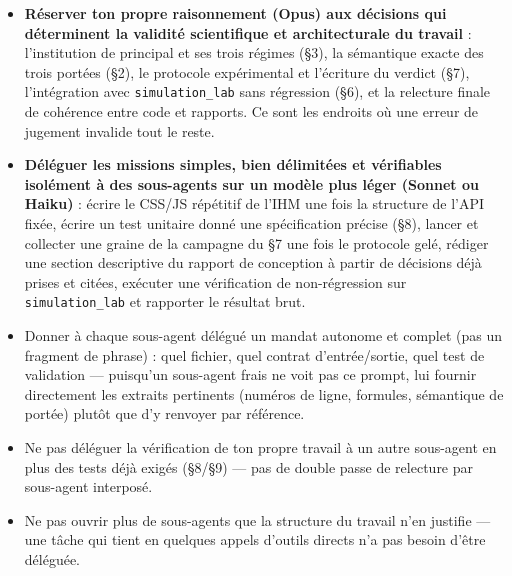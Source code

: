 \documentclass[11pt,a4paper]{article}
\newcommand{\code}[1]{\texttt{#1}}
\begin{document}
\begin{itemize}
\item \textbf{Réserver ton propre raisonnement (Opus) aux décisions qui
  déterminent la validité scientifique et architecturale du travail} :
  l'institution de principal et ses trois régimes (\S3), la sémantique
  exacte des trois portées (\S2), le protocole expérimental et
  l'écriture du verdict (\S7), l'intégration avec \code{simulation\_lab}
  sans régression (\S6), et la relecture finale de cohérence entre code
  et rapports. Ce sont les endroits où une erreur de jugement invalide
  tout le reste.
\item \textbf{Déléguer les missions simples, bien délimitées et
  vérifiables isolément à des sous-agents sur un modèle plus léger
  (Sonnet ou Haiku)} : écrire le CSS/JS répétitif de l'IHM une fois la
  structure de l'API fixée, écrire un test unitaire donné une
  spécification précise (\S8), lancer et collecter une graine de la
  campagne du \S7 une fois le protocole gelé, rédiger une section
  descriptive du rapport de conception à partir de décisions déjà
  prises et citées, exécuter une vérification de non-régression sur
  \code{simulation\_lab} et rapporter le résultat brut.
\item Donner à chaque sous-agent délégué un mandat autonome et complet
  (pas un fragment de phrase) : quel fichier, quel contrat
  d'entrée/sortie, quel test de validation --- puisqu'un sous-agent frais
  ne voit pas ce prompt, lui fournir directement les extraits pertinents
  (numéros de ligne, formules, sémantique de portée) plutôt que d'y
  renvoyer par référence.
\item Ne pas déléguer la vérification de ton propre travail à un autre
  sous-agent en plus des tests déjà exigés (\S8/\S9) --- pas de double
  passe de relecture par sous-agent interposé.
\item Ne pas ouvrir plus de sous-agents que la structure du travail n'en
  justifie --- une tâche qui tient en quelques appels d'outils directs
  n'a pas besoin d'être déléguée.
\end{itemize}
\end{document}
